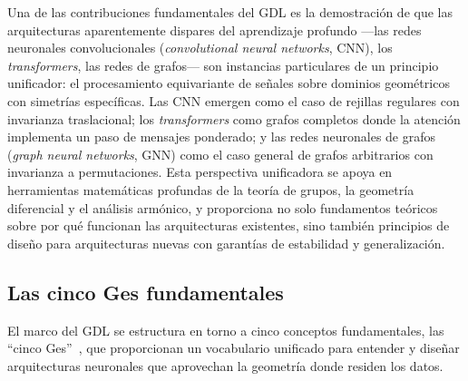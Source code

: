 Una de las contribuciones fundamentales del GDL es la demostraci\'on de que las
arquitecturas aparentemente dispares del aprendizaje profundo ---las redes
neuronales convolucionales (\emph{convolutional neural networks}, CNN), los
\emph{transformers}, las redes de grafos--- son instancias particulares de un
principio unificador: el procesamiento equivariante de se\~nales sobre dominios
geom\'etricos con simetr\'ias espec\'ificas. Las CNN emergen como el caso de
rejillas regulares con invarianza traslacional; los \emph{transformers} como
grafos completos donde la atenci\'on implementa un paso de mensajes ponderado; y
las redes neuronales de grafos (\emph{graph neural networks}, GNN) como el caso
general de grafos arbitrarios con invarianza a permutaciones. Esta perspectiva
unificadora se apoya en herramientas matem\'aticas profundas de la teor\'ia de
grupos, la geometr\'ia diferencial y el an\'alisis arm\'onico, y proporciona no
solo fundamentos te\'oricos sobre por qu\'e funcionan las arquitecturas
existentes, sino tambi\'en principios de dise\~no para arquitecturas nuevas con
garant\'ias de estabilidad y generalizaci\'on.

\subsection{Las cinco Ges fundamentales}
\label{subsec:priors:five-gs}

El marco del GDL se estructura en torno a cinco conceptos fundamentales, las
``cinco Ges''~\citep{bronstein2017geometric, bronstein2021geometric},
que proporcionan un vocabulario unificado para entender y dise\~nar arquitecturas
neuronales que aprovechan la geometr\'ia donde residen los datos.

